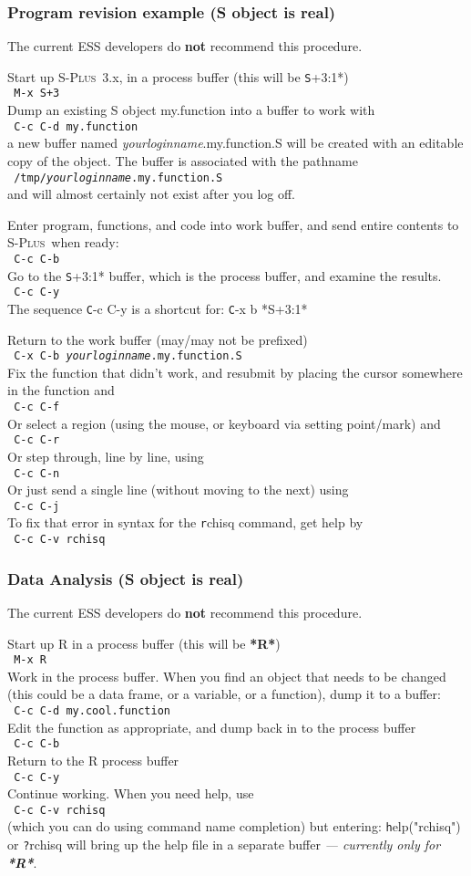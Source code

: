 \documentclass{article}
\newcommand*{\Splus}{\textsc{S-Plus}}
\newcommand{\elcode}[1]{\\{\texttt{\hspace*{2em} #1}}\\}
\begin{document}
\subsubsection{Program revision example (S object is real)}
The current ESS developers do {\bf not} recommend this procedure.

\noindent
Start up \Splus~3.x, in a process buffer (this will be {\texttt *S+3:1*}) 
  \elcode{M-x S+3}
Dump an existing S object my.function into a buffer to work with
  \elcode{C-c C-d my.function}
a new buffer named \textit{yourloginname}.my.function.S will be created with
an editable copy of the object.  The buffer is associated with the
pathname
 \elcode{/tmp/\textit{yourloginname}.my.function.S}
and will almost certainly not exist after you log off.

Enter program, functions, and code into work buffer,
and send entire contents to \Splus\ when ready:
  \elcode{C-c C-b}
Go to the {\texttt *S+3:1*} buffer, which is the process buffer, and examine
the results.
  \elcode{C-c C-y}
The sequence {\texttt C-c C-y} is a shortcut for:  {\texttt C-x b *S+3:1*}

Return to the work buffer (may/may not be prefixed)
  \elcode{C-x C-b \textit{yourloginname}.my.function.S}
Fix the function that didn't work, and resubmit by
placing the cursor somewhere in the function and
  \elcode{C-c C-f}
Or select a region (using the mouse, or keyboard
via setting point/mark) and
  \elcode{C-c C-r}
Or step through, line by line, using
  \elcode{C-c C-n}
Or just send a single line (without moving to the next) using
  \elcode{C-c C-j}
To fix that error in syntax for the {\texttt rchisq} command, get help
by
  \elcode{C-c C-v rchisq}

\subsubsection{Data Analysis (S object is real)}
The current ESS developers do {\bf not} recommend this procedure.

\noindent
Start up R in a process buffer (this will be \textbf{*R*}) 
  \elcode{M-x R}
Work in the process buffer.  When you find an object that needs
to be changed (this could be a data frame, or a variable,
or a function), dump it to a buffer:
  \elcode{C-c C-d my.cool.function}
Edit the function as appropriate, and dump back in to the
process buffer
  \elcode{C-c C-b}
Return to the R process buffer
  \elcode{C-c C-y}
Continue working.
When you need help, use
  \elcode{C-c C-v rchisq}
(which you can do using command name completion)
but entering:   {\texttt help("rchisq")} or {\texttt ?rchisq}
will bring up the help file in a separate buffer
\emph{--- currently only for \textbf{*R*}}.
\end{document}
